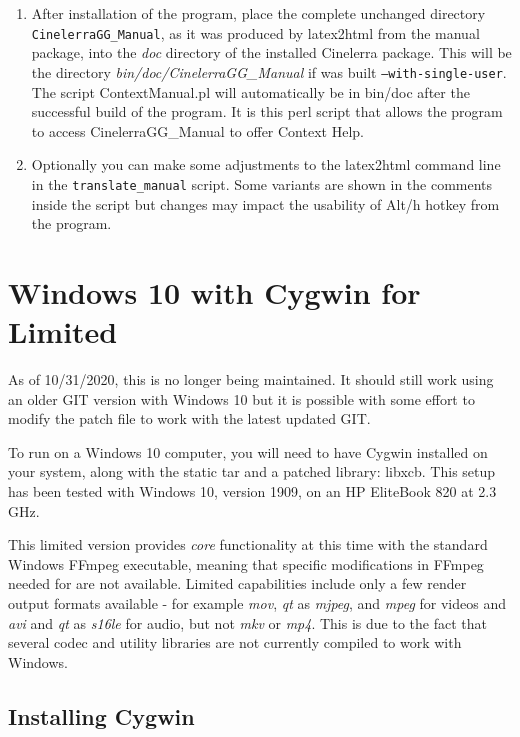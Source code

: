 \begin{enumerate}
	\item After installation of the \CGG{} program, place the complete unchanged directory \texttt{CinelerraGG\_Manual}, as it was produced by latex2html from the manual package, into the \textit{doc} directory of the installed Cinelerra package. This will be the directory \textit{bin/doc/CinelerraGG\_Manual} if \CGG{} was built \texttt{--with-single-user}. The script ContextManual.pl will automatically be in bin/doc after the successful build of the program. It is this perl script that allows the program to access CinelerraGG\_Manual to offer Context Help.

	\item Optionally you can make some adjustments to the latex2html command line in the \texttt{translate\_manual} script. Some variants are shown in the comments inside the script but changes may impact the usability of Alt/h hotkey from the program.
\end{enumerate}

\section{Windows 10 with Cygwin for \CGG{} Limited}%
\label{sec:ms_windows10}

As of 10/31/2020, this is no longer being maintained.  It should
still work using an older GIT version with Windows 10 but it is
possible with some effort to modify the patch file to work with the
latest updated GIT.

To run \CGG{} on a Windows 10 computer, you will need to have
Cygwin installed on your system, along with the \CGG{} static tar
and a patched library: libxcb.  This setup has been tested with
Windows 10, version 1909, on an HP EliteBook 820 at 2.3 GHz.

This limited version provides \textit{core} functionality at this
time with the standard Windows FFmpeg executable, meaning that
specific modifications in FFmpeg needed for \CGG{} are not
available.  Limited capabilities include only a few render output
formats available - for example \textit{mov}, \textit{qt} as
\textit{mjpeg}, and \textit{mpeg} for videos and \textit{avi} and
\textit{qt} as \textit{s16le} for audio, but not \textit{mkv} or
\textit{mp4}.  This is due to the fact that several codec and
utility libraries are not currently compiled to work with Windows.

\subsection*{Installing Cygwin}
\label{sec:installing_cygwin}

